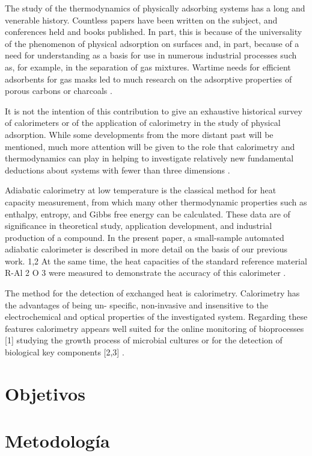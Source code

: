 	The study of the thermodynamics of physically adsorbing systems has a long and venerable history. Countless papers have been written on the subject, and conferences held and books published. In part, this is because of the universality of the phenomenon of physical adsorption on surfaces and, in part, because of a need for understanding as a basis for use in numerous industrial processes such as, for example, in the separation of gas mixtures. Wartime needs for efficient adsorbents for gas masks led to much research on the adsorptive properties of porous carbons or charcoals \cite{morrison1987calorimetry}.
	
	It is not the intention of this contribution to give an exhaustive historical survey of	calorimeters or of the application of calorimetry in the study of physical adsorption.	While some developments from the more distant past will be mentioned, much more attention
	will be given to the role that calorimetry and thermodynamics can play in helping to investigate relatively new fundamental deductions about systems with fewer than three dimensions \cite{morrison1987calorimetry}.
	
	Adiabatic calorimetry at low temperature is the classical method for heat capacity measurement, from which many other thermodynamic properties such as enthalpy, entropy, and Gibbs free energy can be calculated. These data are of significance in theoretical study, application development, and industrial production of a compound. In the present
	paper, a small-sample automated adiabatic calorimeter is
	described in more detail on the basis of our previous
	work. 1,2 At the same time, the heat capacities of the
	standard reference material R-Al 2 O 3 were measured to
	demonstrate the accuracy of this calorimeter \cite{wang2005determination}.
	
	The method for the detection of exchanged heat is
	calorimetry. Calorimetry has the advantages of being un-
	specific, non-invasive and insensitive to the electrochemical	and optical properties of the investigated system. Regarding these features calorimetry appears well suited for the online
	monitoring of bioprocesses [1] studying the growth process	of microbial cultures or for the detection of biological key components [2,3] \cite{winkelmann2004application}.
\section{Objetivos}

\section{Metodología}

